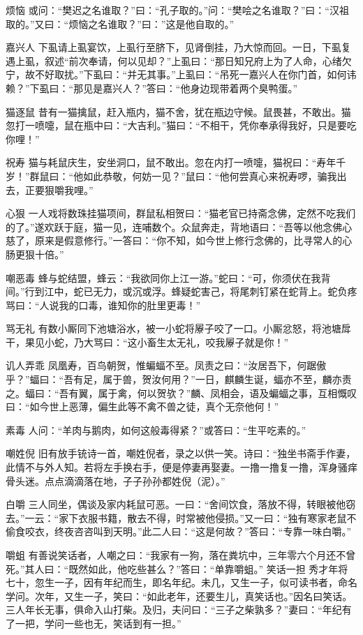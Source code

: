 \documentclass[12pt,UTF8]{ctexbook}
\begin{document}
烦恼
或问：“樊迟之名谁取？”曰：“孔子取的。”问：“樊哙之名谁取？”曰：“汉祖取的。”又曰：“烦恼之名谁取？”曰：”这是他自取的。”

嘉兴人
下虱请上虱宴饮，上虱行至脐下，见肾倒挂，乃大惊而回。一日，下虱复遇上虱，叙述“前次奉请，何以见却？”上虱曰：“那日知兄府上为了人命，心绪欠宁，故不好取扰。”下虱曰：“并无其事。”上虱曰：“吊死一嘉兴人在你门首，如何讳赖？”下虱曰：“那见是嘉兴人？”答曰：“他身边现带着两个臭鸭蛋。”

猫逐鼠
昔有一猫擒鼠，赶入瓶内，猫不舍，犹在瓶边守候。鼠畏甚，不敢出。猫忽打一喷嚏，鼠在瓶中曰：“大吉利。”猫曰：“不相干，凭你奉承得我好，只是要吃你哩！”

祝寿
猫与耗鼠庆生，安坐洞口，鼠不敢出。忽在内打一喷嚏，猫祝曰：“寿年千岁！”群鼠曰：“他如此恭敬，何妨一见？”鼠曰：“他何尝真心来祝寿啰，骗我出去，正要狠嚼我哩。”

心狠
一人戏将数珠挂猫项间，群鼠私相贺曰：“猫老官已持斋念佛，定然不吃我们的了。”遂欢跃于庭，猫一见，连哺数个。众鼠奔走，背地语曰：“吾等以他念佛心慈了，原来是假意修行。”一答曰：“你不知，如今世上修行念佛的，比寻常人的心肠更狠十倍。”

嘲恶毒
蜂与蛇结盟，蜂云：“我欲同你上江一游。”蛇曰：“可，你须伏在我背间。”行到江中，蛇已无力，或沉或浮。蜂疑蛇害己，将尾刺钉紧在蛇背上。蛇负疼骂曰：“人说我的口毒，谁知你的肚里更毒！”

骂无礼
有数小厮同下池塘浴水，被一小蛇将屪子咬了一口。小厮忿怒，将池塘戽干，果见小蛇，乃大骂曰：“这小畜生太无礼，咬我屪子就是你！”

讥人弄乖
凤凰寿，百鸟朝贺，惟蝙蝠不至。凤责之曰：“汝居吾下，何踞傲乎？”蝠曰：“吾有足，属于兽，贺汝何用？”一日，麒麟生诞，蝠亦不至，麟亦责之。蝠曰：“吾有翼，属于禽，何以贺欤？”麟、凤相会，语及蝙蝠之事，互相慨叹曰：“如今世上恶薄，偏生此等不禽不兽之徒，真个无奈他何！”

素毒
人问：“羊肉与鹅肉，如何这般毒得紧？”或答曰：“生平吃素的。”

嘲姓倪
旧有放手铳诗一首，嘲姓倪者，录之以供一笑。诗曰：“独坐书斋手作妻，此情不与外人知。若将左手换右手，便是停妻再娶妻。一撸一撸复一撸，浑身骚痒骨头迷。点点滴滴落在地，子子孙孙都姓倪（泥）。”

白嚼
三人同坐，偶谈及家内耗鼠可恶。一曰：“舍间饮食，落放不得，转眼被他窃去。”一云：“家下衣服书籍，散去不得，时常被他侵损。”又一曰：“独有寒家老鼠不偷食咬衣，终夜咨咨叫到天明。”此二人曰：“这是何故？”答曰：“专靠一味白嚼。”

嚼蛆
有善说笑话者，人嘲之曰：“我家有一狗，落在粪坑中，三年零六个月还不曾死。”其人曰：“既然如此，他吃些甚么？”答曰：“单靠嚼蛆。”
笑话一担
秀才年将七十，忽生一子，因有年纪而生，即名年纪。未几，又生一子，似可读书者，命名学问。次年，又生一子，笑曰：“如此老年，还要生儿，真笑话也。”因名曰笑话。三人年长无事，俱命入山打柴。及归，夫问曰：“三子之柴孰多？”妻曰：“年纪有了一把，学问一些也无，笑话到有一担。”
\end{document}
